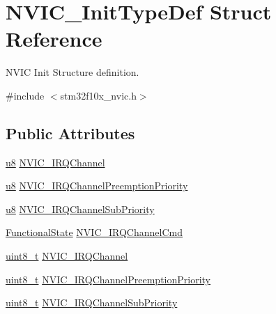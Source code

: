 \hypertarget{struct_n_v_i_c___init_type_def}{}\section{N\+V\+I\+C\+\_\+\+Init\+Type\+Def Struct Reference}
\label{struct_n_v_i_c___init_type_def}


N\+V\+IC Init Structure definition.  




{\ttfamily \#include $<$stm32f10x\+\_\+nvic.\+h$>$}

\subsection*{Public Attributes}
\begin{DoxyCompactItemize}
\item 
\hyperlink{agilefox_2library_2inc_2stm32f10x__type_8h_aed742c436da53c1080638ce6ef7d13de}{u8} \hyperlink{struct_n_v_i_c___init_type_def_a2309c52a0c88793d005fd43173129267}{N\+V\+I\+C\+\_\+\+I\+R\+Q\+Channel}
\item 
\hyperlink{agilefox_2library_2inc_2stm32f10x__type_8h_aed742c436da53c1080638ce6ef7d13de}{u8} \hyperlink{struct_n_v_i_c___init_type_def_adc8226d770dbf7513448c12e14f30198}{N\+V\+I\+C\+\_\+\+I\+R\+Q\+Channel\+Preemption\+Priority}
\item 
\hyperlink{agilefox_2library_2inc_2stm32f10x__type_8h_aed742c436da53c1080638ce6ef7d13de}{u8} \hyperlink{struct_n_v_i_c___init_type_def_a0d908a33a2250776d6016117a3b874aa}{N\+V\+I\+C\+\_\+\+I\+R\+Q\+Channel\+Sub\+Priority}
\item 
\hyperlink{agilefox_2library_2inc_2stm32f10x__type_8h_ac9a7e9a35d2513ec15c3b537aaa4fba1}{Functional\+State} \hyperlink{struct_n_v_i_c___init_type_def_acb23fabb995fa4980c768825f12f5815}{N\+V\+I\+C\+\_\+\+I\+R\+Q\+Channel\+Cmd}
\item 
\hyperlink{_p_e___types_8h_aba7bc1797add20fe3efdf37ced1182c5}{uint8\+\_\+t} \hyperlink{struct_n_v_i_c___init_type_def_afa04cf6e559bb690bdd9fcb7e3d93dcf}{N\+V\+I\+C\+\_\+\+I\+R\+Q\+Channel}
\item 
\hyperlink{_p_e___types_8h_aba7bc1797add20fe3efdf37ced1182c5}{uint8\+\_\+t} \hyperlink{struct_n_v_i_c___init_type_def_aa3fe262c30188404a6e31f922c5ae513}{N\+V\+I\+C\+\_\+\+I\+R\+Q\+Channel\+Preemption\+Priority}
\item 
\hyperlink{_p_e___types_8h_aba7bc1797add20fe3efdf37ced1182c5}{uint8\+\_\+t} \hyperlink{struct_n_v_i_c___init_type_def_aecc22a002244e3f1f9448dbe46c1db4b}{N\+V\+I\+C\+\_\+\+I\+R\+Q\+Channel\+Sub\+Priority}
\end{DoxyCompactItemize}


